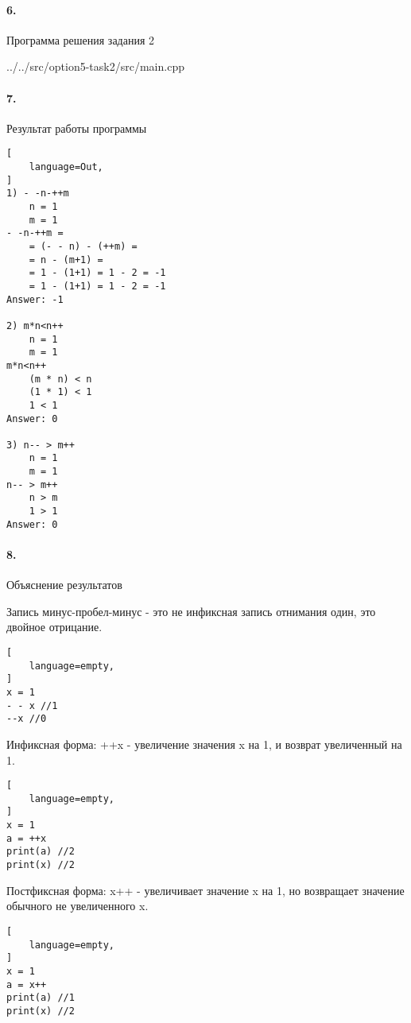 \paragraph{6.} Программа решения задания 2


{../../src/option5-task2/src/main.cpp}

\newpage

\paragraph{7.} Результат работы программы

\begin{lstlisting}[
    language=Out,
]
1) - -n-++m
	n = 1
	m = 1
- -n-++m = 
	= (- - n) - (++m) = 
	= n - (m+1) = 
	= 1 - (1+1) = 1 - 2 = -1
	= 1 - (1+1) = 1 - 2 = -1
Answer: -1

2) m*n<n++
	n = 1
	m = 1
m*n<n++
	(m * n) < n
	(1 * 1) < 1
	1 < 1
Answer: 0

3) n-- > m++
	n = 1
	m = 1
n-- > m++
	n > m
	1 > 1
Answer: 0
\end{lstlisting}

\paragraph{8.} Объяснение результатов

Запись минус-пробел-минус - это не инфиксная запись отнимания один, это двойное отрицание.

\begin{lstlisting}[
    language=empty,
]
x = 1
- - x //1
--x //0
\end{lstlisting}

Инфиксная форма: ++x - увеличение значения x на 1, и возврат увеличенный на 1.

\begin{lstlisting}[
    language=empty,
]
x = 1
a = ++x
print(a) //2
print(x) //2
\end{lstlisting}

Постфиксная форма: x++ - увеличивает значение x на 1, но возвращает значение обычного не увеличенного x.

\begin{lstlisting}[
    language=empty,
]
x = 1
a = x++
print(a) //1
print(x) //2
\end{lstlisting}